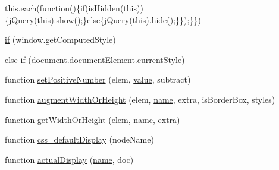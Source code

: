\begin{DoxyCompactItemize}
\hyperlink{jquery_8min_8js_acac159895212e159f5cbd2080cc4d737}{this.\+each}(function()\{\hyperlink{menu_2tpl_2js_2jquery_8jstree_8js_acba95bef569cfaee32c4ed0212b2bb92}{if}(\hyperlink{jquery-1_8x_8js_a67ed58d688ff11991ca2826ebfbf28a4}{is\+Hidden}(\hyperlink{jquery_8parallax-scroll_8min_8js_a05c09a5e9d53fa7adf0a7936038c2fa3}{this}))\{\hyperlink{xe__solid__enterprise__login_2js_2login_8js_a5d40f04b6bb824963a42ec4b5fbfe262}{j\+Query}(\hyperlink{jquery_8parallax-scroll_8min_8js_a05c09a5e9d53fa7adf0a7936038c2fa3}{this}).show();\}\hyperlink{swfupload_8js_a0544c3fe466e421738dae463968b70ba}{else}\{\hyperlink{xe__solid__enterprise__login_2js_2login_8js_a5d40f04b6bb824963a42ec4b5fbfe262}{j\+Query}(\hyperlink{jquery_8parallax-scroll_8min_8js_a05c09a5e9d53fa7adf0a7936038c2fa3}{this}).hide();\}\});\}\})
\item 
\hyperlink{jquery-1_8x_8js_add3620f254b483a46b557fde577ecbf7}{if} (window.\+get\+Computed\+Style)
\item 
\hyperlink{swfupload_8js_a0544c3fe466e421738dae463968b70ba}{else} \hyperlink{jquery-1_8x_8js_ac118b48e1947a1d7c85fefbdad49502e}{if} (document.\+document\+Element.\+current\+Style)
\item 
function \hyperlink{jquery-1_8x_8js_a049182834e8b4b2d7485cd919ed272d7}{set\+Positive\+Number} (elem, \hyperlink{jquery_8js_abe5393d870043cf6aaa1d5ad5fce755c}{value}, subtract)
\item 
function \hyperlink{jquery-1_8x_8js_aacaac1f0b5ea53030522e6f5b227ce51}{augment\+Width\+Or\+Height} (elem, \hyperlink{common_8js_a22c29d2aa8ed6161ce8faa718ef76e68}{name}, extra, is\+Border\+Box, styles)
\item 
function \hyperlink{jquery-1_8x_8js_a6520fbbeac78eeb0f519393470dc873b}{get\+Width\+Or\+Height} (elem, \hyperlink{common_8js_a22c29d2aa8ed6161ce8faa718ef76e68}{name}, extra)
\item 
function \hyperlink{jquery-1_8x_8js_a90f91be23732240774f2a323d500c78a}{css\+\_\+default\+Display} (node\+Name)
\item 
function \hyperlink{jquery-1_8x_8js_a88bc5a80e40ccc594ece17ae5772d5d3}{actual\+Display} (\hyperlink{common_8js_a22c29d2aa8ed6161ce8faa718ef76e68}{name}, doc)
\item 

\end{DoxyCompactItemize}
